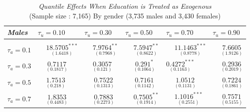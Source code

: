 \documentclass[12pt,a4paper]{article}
\begin{document}
\begin{table}[!htbp]
\captionsetup{labelsep=newline, justification=centering}
  \begin{threeparttable}
       \caption{\textit{Quantile Effects When Education is Treated as Exogenous} \\
    \scriptsize (Sample size : 7,165) By gender (3,735 males and 3,430 females)}
     \begin{tabular}{*{6}{l}}
        \toprule 
        \textit{Males}  & \( \tau_u=0.10\) & \( \tau_u= 0.30\) & \( \tau_u= 0.50\) & \( \tau_u= 0.70\) & \( \tau_u= 0.90\) \\
        \midrule     \\
        $\tau_a = 0.1$    & $\phantom{-}\underset{(1.6418)}{18.5705^{***}}$ & $\phantom{-}\underset{(0.7968)}{7.9764^{**}}$ & $\phantom{-}\underset{(0.8622)}{7.5947^{**}}$ & $\phantom{-}\underset{(0.8778)}{11.1463^{***}}$ & $\phantom{-}\underset{(1.9126)}{7.6605}$  
\\
         $\tau_a = 0.3$   & $\phantom{-}\underset{(0.1817)}{0.7117}$ & $\phantom{-}\underset{(0.121)}{0.3057}$ & $\phantom{-}\underset{(0.1064)}{0.291^{*}}$ & $\underset{(0.1163)}{0.4272^{***}}$ & $\phantom{-}\underset{(0.2019)}{0.2936}$
\\
          $\tau_a = 0.5$    & $\phantom{-}\underset{(0.218)}{1.7513}$ & $\phantom{-}\underset{(0.1313)}{0.7522}$ & $\phantom{-}\underset{(0.1142)}{0.7161}$ & $\phantom{-}\underset{(0.1131)}{1.0512}$ & $\phantom{-}\underset{(0.1861)}{0.7224}$ \\
           $\tau_a = 0.7$   & $\phantom{-}\underset{(0.4483)}{1.8353}$ & $\phantom{-}\underset{(0.2273)}{0.7883}$ & $\phantom{-}\underset{(0.1914)}{0.7505^{**}}$ & $\phantom{-}\underset{(0.2551)}{1.1016^{***}}$ & $\phantom{-}\underset{(0.5155)}{0.7571}$  
           \\
           

\end{tabular}
\end{threeparttable}
\end{table}
\end{document}
